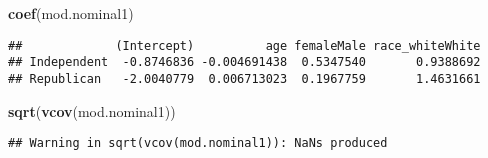 \documentclass[]{article}
\newenvironment{Shaded}{\begin{snugshade}}{\end{snugshade}}
\newcommand{\KeywordTok}[1]{\textcolor[rgb]{0.13,0.29,0.53}{\textbf{{#1}}}}
\newcommand{\NormalTok}[1]{{#1}}
\begin{document}
\begin{Shaded}
\begin{Highlighting}[]
\KeywordTok{coef}\NormalTok{(mod.nominal1)}
\end{Highlighting}
\end{Shaded}

\begin{verbatim}
##             (Intercept)          age femaleMale race_whiteWhite
## Independent  -0.8746836 -0.004691438  0.5347540       0.9388692
## Republican   -2.0040779  0.006713023  0.1967759       1.4631661
\end{verbatim}

\begin{Shaded}
\begin{Highlighting}[]
\KeywordTok{sqrt}\NormalTok{(}\KeywordTok{vcov}\NormalTok{(mod.nominal1))}
\end{Highlighting}
\end{Shaded}

\begin{verbatim}
## Warning in sqrt(vcov(mod.nominal1)): NaNs produced
\end{verbatim}
\end{document}
